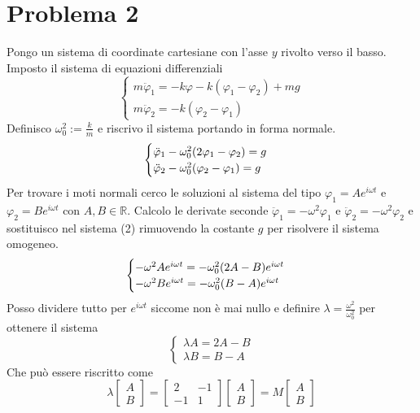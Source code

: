 \documentclass{scrartcl}
\renewcommand{\phi}{\varphi}
\begin{document}
\section*{Problema 2}
    Pongo un sistema di coordinate cartesiane con l'asse \(y\) rivolto verso il basso.
    Imposto il sistema di equazioni differenziali
    \begin{equation}
        \begin{cases}
            m \ddot \phi_1 = -k \phi -k(\phi_1 - \phi_2) + mg \\
            m \ddot \phi_2 = -k (\phi_2 - \phi_1)
        \end{cases}
    \end{equation}
    Definisco \(\omega_0^2 := \frac{k}{m}\) e riscrivo il sistema portando in forma normale.
    \begin{equation}
        \begin{cases}
            \ddot \phi_1 - \omega_0^2 \qty(2 \phi_1 - \phi_2) = g \\
            \ddot \phi_2 - \omega_0^2 \qty(\phi_2 - \phi_1) = g
        \end{cases}
    \end{equation}
    Per trovare i moti normali cerco le soluzioni al sistema del tipo \(\phi_1 = A e^{i\omega t}\) e \(\phi_2 = B e^{i \omega t}\) con \(A, B \in \mathbb{R}\).
    Calcolo le derivate seconde \(\ddot \phi_1 = - \omega^2 \phi_1\) e \(\ddot \phi_2 = - \omega^2 \phi_2\) e sostituisco nel sistema (2) rimuovendo la costante \(g\) per risolvere il sistema omogeneo.
    \begin{equation}
        \begin{cases}
            - \omega^2 A e^{i \omega t} = - \omega_0^2 \qty(2A -B) e^{i \omega t} \\
            - \omega^2 B e^{i \omega t} = - \omega_0^2 \qty(B-A) e^{i \omega t}
        \end{cases}
    \end{equation}
    Posso dividere tutto per \(e^{i \omega t}\) siccome non è mai nullo e definire \(\lambda = \frac{\omega^2}{\omega_0^2}\) per ottenere il sistema
    \begin{equation}
        \begin{cases}
            \lambda A = 2A-B \\
            \lambda B = B-A
        \end{cases}
    \end{equation}
    Che può essere riscritto come
    \begin{equation}
        \lambda \begin{bmatrix} A \\ B \end{bmatrix} = \begin{bmatrix} 2 & -1 \\ -1 & 1 \end{bmatrix} \begin{bmatrix} A \\ B \end{bmatrix} = M \begin{bmatrix} A \\ B \end{bmatrix}
    \end{equation}
\end{document}
